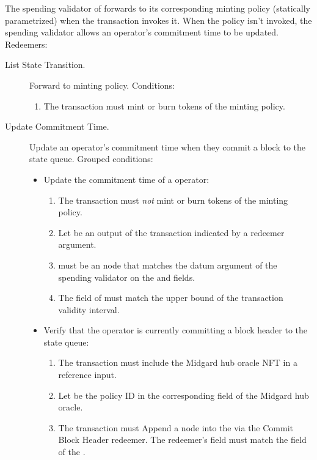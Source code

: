 \documentclass[../midgard.tex]{subfiles}
\begin{document}
The spending validator of  forwards to its corresponding minting policy (statically parametrized) when the transaction invokes it.
When the policy isn't invoked, the spending validator allows an operator's commitment time to be updated.
Redeemers:
\begin{description}
    \item[List State Transition.] Forward to minting policy.
      Conditions:
        \begin{enumerate}
            \item The transaction must mint or burn tokens of the  minting policy.
        \end{enumerate}
    \item[Update Commitment Time.] Update an operator's commitment time when they commit a block to the state queue.
      Grouped conditions:
        \begin{itemize}
            \item Update the commitment time of a operator:
            \begin{enumerate} 
                \item The transaction must \emph{not} mint or burn tokens of the  minting policy.
                \item Let  be an output of the transaction indicated by a redeemer argument.
                \item {} must be an  node that matches the datum argument of the spending validator on the  and  fields.
                \item The  field of  must match the upper bound of the transaction validity interval.
            \end{enumerate}
            \item Verify that the operator is currently committing a block header to the state queue:
            \begin{enumerate}[resume]
                \item The transaction must include the Midgard hub oracle NFT in a reference input.
                \item Let  be the policy ID in the corresponding field of the Midgard hub oracle.
                \item The transaction must Append a node into the  via the Commit Block Header redeemer.
                  The redeemer's  field must match the  field of the .
            \end{enumerate}
        \end{itemize}
\end{description}
\end{document}
